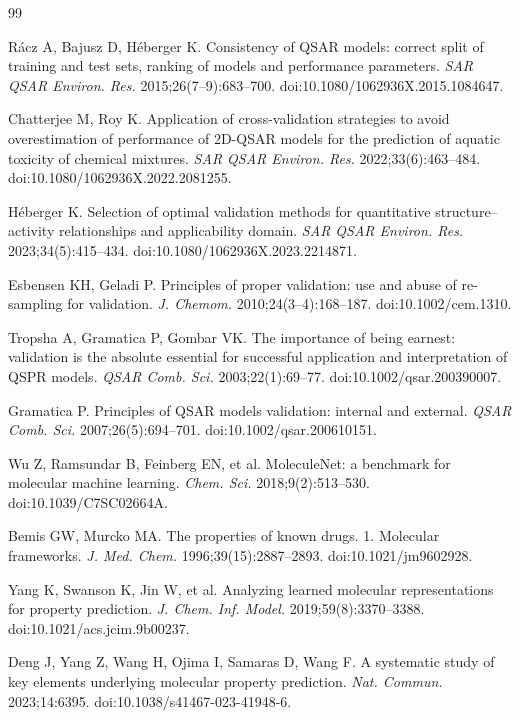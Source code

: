 \begin{thebibliography}{99}

Rácz A, Bajusz D, Héberger K. Consistency of QSAR models: correct split of training and test sets, ranking of models and performance parameters. \textit{SAR QSAR Environ. Res.} 2015;26(7--9):683--700. doi:10.1080/1062936X.2015.1084647.

Chatterjee M, Roy K. Application of cross-validation strategies to avoid overestimation of performance of 2D-QSAR models for the prediction of aquatic toxicity of chemical mixtures. \textit{SAR QSAR Environ. Res.} 2022;33(6):463--484. doi:10.1080/1062936X.2022.2081255.

Héberger K. Selection of optimal validation methods for quantitative structure--activity relationships and applicability domain. \textit{SAR QSAR Environ. Res.} 2023;34(5):415--434. doi:10.1080/1062936X.2023.2214871.

Esbensen KH, Geladi P. Principles of proper validation: use and abuse of re-sampling for validation. \textit{J. Chemom.} 2010;24(3--4):168--187. doi:10.1002/cem.1310.

Tropsha A, Gramatica P, Gombar VK. The importance of being earnest: validation is the absolute essential for successful application and interpretation of QSPR models. \textit{QSAR Comb. Sci.} 2003;22(1):69--77. doi:10.1002/qsar.200390007.

Gramatica P. Principles of QSAR models validation: internal and external. \textit{QSAR Comb. Sci.} 2007;26(5):694--701. doi:10.1002/qsar.200610151.

Wu Z, Ramsundar B, Feinberg EN, et al. MoleculeNet: a benchmark for molecular machine learning. \textit{Chem. Sci.} 2018;9(2):513--530. doi:10.1039/C7SC02664A.

Bemis GW, Murcko MA. The properties of known drugs. 1. Molecular frameworks. \textit{J. Med. Chem.} 1996;39(15):2887--2893. doi:10.1021/jm9602928.

Yang K, Swanson K, Jin W, et al. Analyzing learned molecular representations for property prediction. \textit{J. Chem. Inf. Model.} 2019;59(8):3370--3388. doi:10.1021/acs.jcim.9b00237.

Deng J, Yang Z, Wang H, Ojima I, Samaras D, Wang F. A systematic study of key elements underlying molecular property prediction. \textit{Nat. Commun.} 2023;14:6395. doi:10.1038/s41467-023-41948-6.


\end{thebibliography}
